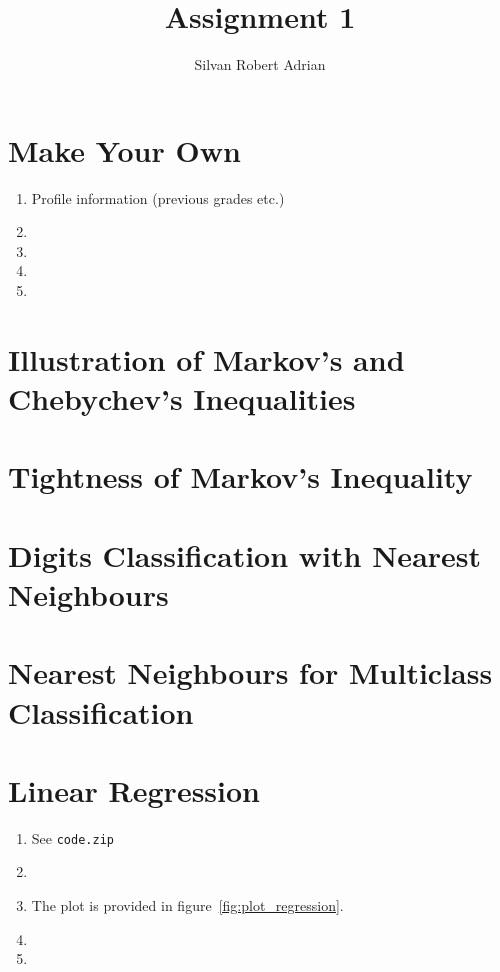\documentclass[a4paper]{article}
\title{\vspace{-5cm} Assignment 1}
\author{Silvan Robert Adrian}
\begin{document}
\maketitle

\tableofcontents

\section{Make Your Own}
\begin{enumerate}
  \item Profile information (previous grades etc.)
  \item 
  \item 
  \item 
  \item 
\end{enumerate}

\section{Illustration of Markov's and Chebychev's Inequalities}

\section{Tightness of Markov's Inequality}

\section{Digits Classification with Nearest Neighbours}

\section{Nearest Neighbours for Multiclass Classification}

\section{Linear Regression}

\begin{enumerate}
  \item See \texttt{code.zip}
  \item 
  \item The plot is provided in figure~\ref{fig:plot_regression}.
  \item 
  \item 
\end{enumerate}
\end{document}
